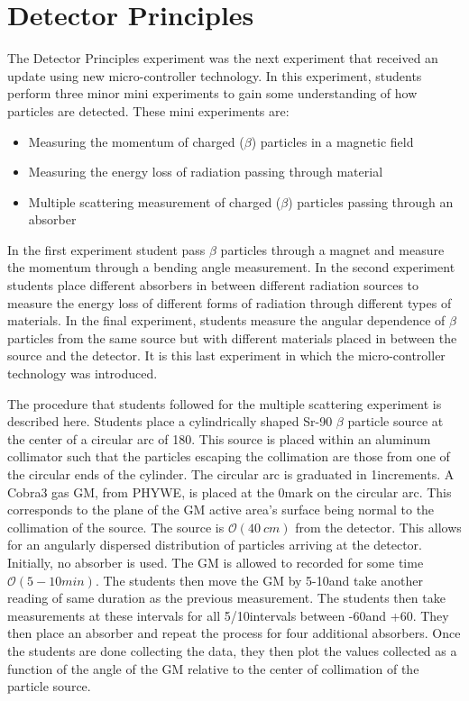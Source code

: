 \section{Detector Principles}
The Detector Principles experiment was the next experiment that received an update using new micro-controller technology.
In this experiment, students perform three minor mini experiments to gain some understanding of how particles are detected.
These mini experiments are:
\begin{itemize}
\item Measuring the momentum of charged ($\beta$) particles in a magnetic field
\item Measuring the energy loss of radiation passing through material
\item Multiple scattering measurement of charged ($\beta$) particles passing through an absorber
\end{itemize}

In the first experiment student pass $\beta$ particles through a magnet and measure the momentum through a bending angle measurement.
In the second experiment students place different absorbers in between different radiation sources to measure the energy loss of different forms of radiation through different types of materials.
In the final experiment, students measure the angular dependence of $\beta$ particles from the same source but with different materials placed in between the source and the detector.
It is this last experiment in which the micro-controller technology was introduced.

The procedure that students followed for the multiple scattering experiment is described here.
Students place a cylindrically shaped Sr-90 $\beta$ particle source at the center of a circular arc of 180\textdegree.
This source is placed within an aluminum collimator such that the particles escaping the collimation are those from one of the circular ends of the cylinder.
The circular arc is graduated in 1\textdegree increments.
A Cobra3 gas GM, from PHYWE, is placed at the 0\textdegree mark on the circular arc.
This corresponds to the plane of the GM active area's surface being normal to the collimation of the source.
The source is $\mathcal{O}(40~cm)$ from the detector.
This allows for an angularly dispersed distribution of particles arriving at the detector.
Initially, no absorber is used.
The GM is allowed to recorded for some time $\mathcal{O}(5-10 min)$.
The students then move the GM by 5-10\textdegree and take another reading of same duration as the previous measurement.
The students then take measurements at these intervals for all 5/10\textdegree intervals between -60\textdegree and +60\textdegree.
They then place an absorber and repeat the process for four additional absorbers.
Once the students are done collecting the data, they then plot the values collected as a function of the angle of the GM relative to the center of collimation of the particle source.


